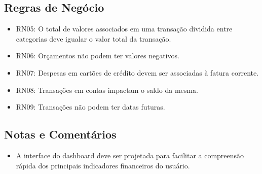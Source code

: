 \subsection*{Regras de Negócio}
\begin{addmargin}[1.5cm]{0cm}
	\begin{itemize}
		\item RN05: O total de valores associados em uma transação dividida entre categorias deve igualar o valor total da transação.
		\item RN06: Orçamentos não podem ter valores negativos.
		\item RN07: Despesas em cartões de crédito devem ser associadas à fatura corrente.
		\item RN08: Transações em contas impactam o saldo da mesma.
		\item RN09: Transações não podem ter datas futuras.
	\end{itemize}
\end{addmargin}

\subsection*{Notas e Comentários}
\begin{addmargin}[1.5cm]{0cm}
	\begin{itemize}
		\item A interface do dashboard deve ser projetada para facilitar a compreensão rápida dos principais indicadores financeiros do usuário.
	\end{itemize}
\end{addmargin}
